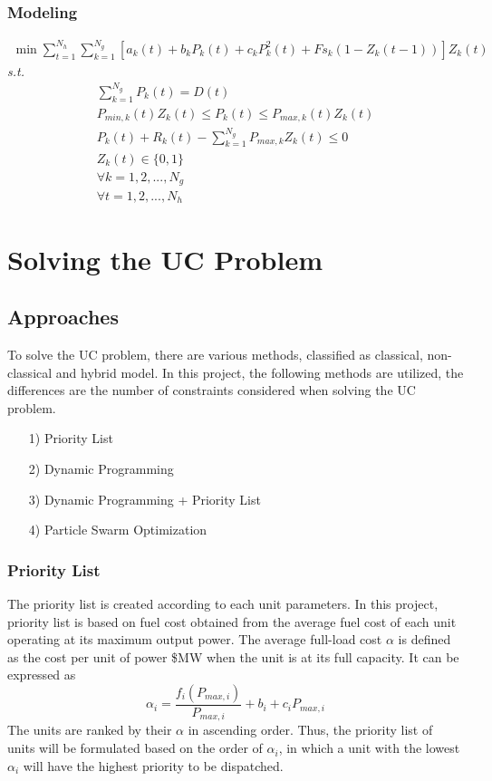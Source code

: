 \documentclass[a4paper, 12pt, notitlepage]{report}
\begin{document}
\subsection{Modeling}
\begin{gather}
\min\sum_{t=1}^{N_h} \sum_{k=1}^{N_g}[a_{k}(t)+b_{k}P_{k}(t)+c_{k}P_{k}^2(t)+Fs_{k}(1-Z_{k}(t-1))]Z_{k}(t)\label{eqn:equ1}
\end{gather}
\textit{s.t.} \\
\begin{gather}
\sum_{k=1}^{N_g}P_{k}(t) = D(t)\label{eqn:equ4}\\
P_{min,k}(t)Z_{k}(t)\leq P_{k}(t)\leq P_{max,k}(t)Z_{k}(t) \label{eqn:equ7}\\
P_{k}(t)+R_{k}(t)-\sum_{k=1}^{N_g}P_{max,k}Z_{k}(t)\leq 0\label{eqn:equ2}\\
Z_{k}(t)\in \{0,1\}\\
\forall k = 1,2,...,N_g\\
\forall t = 1,2,...,N_h
\end{gather}

\chapter{Solving the UC Problem}
\section{Approaches}
To solve the UC problem, there are various methods, classified as classical, non-classical and hybrid model\cite{2,3}. In this project, the following methods are utilized, the differences are the number of constraints considered when solving the UC problem.
\begin{enumerate}
\item[1)]Priority List
\item[2)]Dynamic Programming
\item[3)]Dynamic Programming + Priority List
\item[4)]Particle Swarm Optimization
\end{enumerate}

\subsection{Priority List}
The priority list is created according to each unit parameters. In this project, priority list is based on fuel cost
obtained from the average fuel cost of each unit operating at its maximum output power. The average full-load cost $\alpha$
is defined as the cost per unit of power \$\/MW when the unit is at its full capacity. It can be expressed as
\begin{equation}
\alpha_{i}=\frac{f_{i}(P_{max,i})}{P_{max,i}}+b_{i}+c_{i}P_{max,i}
\end{equation}
The units are ranked by their $\alpha$ in ascending order. Thus, the priority list of units will be formulated based on the order of $\alpha_{i}$,
in which a unit with the lowest $\alpha_{i}$ will have the highest priority to be dispatched.\cite{7}
\end{document}
